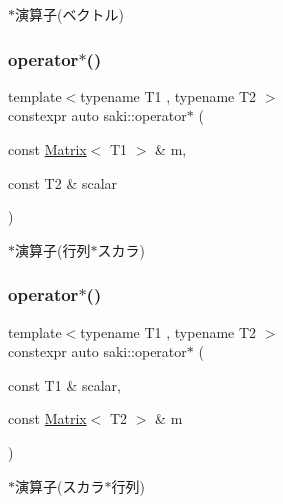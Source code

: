 $\ast$演算子(ベクトル) 

\mbox{\label{namespacesaki_ad348e50faa98837b804c503c3198afc3}} 
\subsubsection{\texorpdfstring{operator$\ast$()}{operator*()}\hspace{0.1cm}{\footnotesize\ttfamily [12/14]}}
{\footnotesize\ttfamily template$<$typename T1 , typename T2 $>$ \\
constexpr auto saki\+::operator$\ast$ (\begin{DoxyParamCaption}\item[{const \mbox{\hyperlink{classsaki_1_1_matrix}{Matrix}}$<$ T1 $>$ \&}]{m,  }\item[{const T2 \&}]{scalar }\end{DoxyParamCaption})}



$\ast$演算子(行列$\ast$スカラ) 

\mbox{\label{namespacesaki_aed1e93efca8468e08d2f569b50c328e0}} 
\subsubsection{\texorpdfstring{operator$\ast$()}{operator*()}\hspace{0.1cm}{\footnotesize\ttfamily [13/14]}}
{\footnotesize\ttfamily template$<$typename T1 , typename T2 $>$ \\
constexpr auto saki\+::operator$\ast$ (\begin{DoxyParamCaption}\item[{const T1 \&}]{scalar,  }\item[{const \mbox{\hyperlink{classsaki_1_1_matrix}{Matrix}}$<$ T2 $>$ \&}]{m }\end{DoxyParamCaption})}



$\ast$演算子(スカラ$\ast$行列) 

\mbox{\label{namespacesaki_a8a8f2d1ac91826453735810908a3c32d}} 
